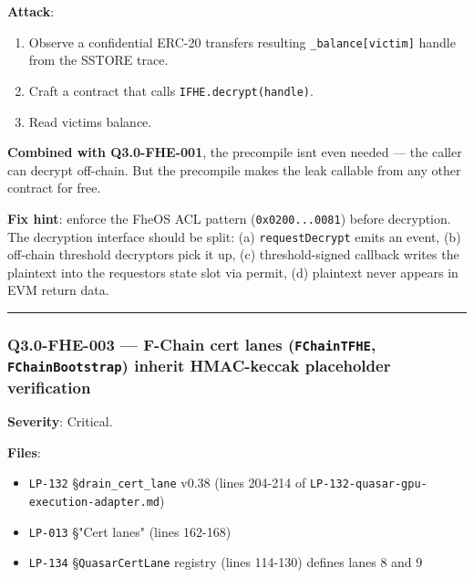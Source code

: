 \documentclass[
]{article}
\providecommand{\tightlist}{%
  \setlength{\itemsep}{0pt}\setlength{\parskip}{0pt}}
\begin{document}
\textbf{Attack}:

\begin{enumerate}
\def\labelenumi{\arabic{enumi}.}
\tightlist
\item
  Observe a confidential ERC-20 transfer\textquotesingle s resulting
  \texttt{\_balance{[}victim{]}} handle from the SSTORE trace.
\item
  Craft a contract that calls \texttt{IFHE.decrypt(handle)}.
\item
  Read victim\textquotesingle s balance.
\end{enumerate}

\textbf{Combined with Q3.0-FHE-001}, the precompile
isn\textquotesingle t even needed --- the caller can decrypt off-chain.
But the precompile makes the leak callable from any other contract for
free.

\textbf{Fix hint}: enforce the FheOS ACL pattern
(\texttt{0x0200...0081}) before decryption. The decryption interface
should be split: (a) \texttt{requestDecrypt} emits an event, (b)
off-chain threshold decryptors pick it up, (c) threshold-signed callback
writes the plaintext into the requestor\textquotesingle s state slot via
permit, (d) plaintext never appears in EVM return data.

\begin{center}\rule{0.5\linewidth}{0.5pt}\end{center}

\subsubsection{\texorpdfstring{Q3.0-FHE-003 --- F-Chain cert lanes
(\texttt{FChainTFHE}, \texttt{FChainBootstrap}) inherit HMAC-keccak
placeholder
verification}{Q3.0-FHE-003 --- F-Chain cert lanes (FChainTFHE, FChainBootstrap) inherit HMAC-keccak placeholder verification}}\label{q30-fhe-003--f-chain-cert-lanes-fchaintfhe-fchainbootstrap-inherit-hmac-keccak-placeholder-verification}

\textbf{Severity}: Critical.

\textbf{Files}:

\begin{itemize}
\tightlist
\item
  \texttt{LP-132} §\texttt{drain\_cert\_lane} v0.38 (lines 204-214 of
  \texttt{LP-132-quasar-gpu-execution-adapter.md})
\item
  \texttt{LP-013} §"Cert lanes" (lines 162-168)
\item
  \texttt{LP-134} §\texttt{QuasarCertLane} registry (lines 114-130)
  defines lanes 8 and 9
\end{itemize}
\end{document}
